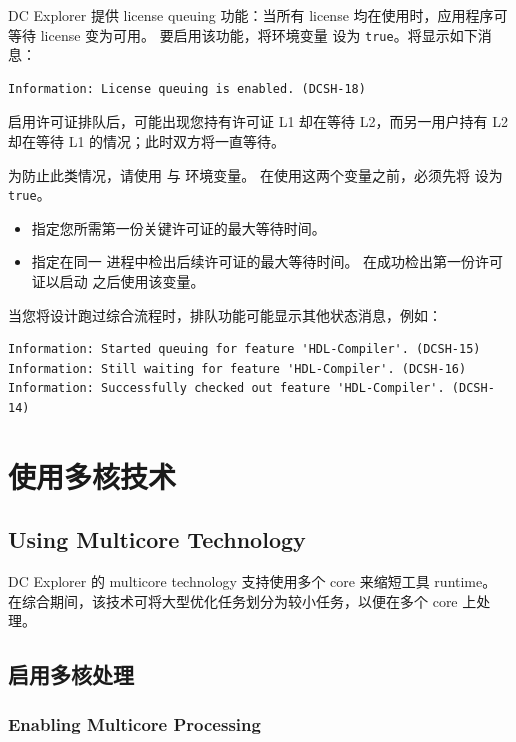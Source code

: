 DC Explorer 提供 license queuing 功能：当所有 license 均在使用时，应用程序可等待 license 变为可用。
要启用该功能，将环境变量  设为 \texttt{true}。将显示如下消息：
\begin{lstlisting}
Information: License queuing is enabled. (DCSH-18)
\end{lstlisting}

启用许可证排队后，可能出现您持有许可证 L1 却在等待 L2，而另一用户持有 L2 却在等待 L1 的情况；此时双方将一直等待。

为防止此类情况，请使用  与  环境变量。
在使用这两个变量之前，必须先将  设为 \texttt{true}。
\begin{itemize}
  \item {} 指定您所需第一份关键许可证的最大等待时间。
  \item {} 指定在同一  进程中检出后续许可证的最大等待时间。
        在成功检出第一份许可证以启动  之后使用该变量。
\end{itemize}

当您将设计跑过综合流程时，排队功能可能显示其他状态消息，例如：
\begin{lstlisting}
Information: Started queuing for feature 'HDL-Compiler'. (DCSH-15)
Information: Still waiting for feature 'HDL-Compiler'. (DCSH-16)
Information: Successfully checked out feature 'HDL-Compiler'. (DCSH-14)
\end{lstlisting}

\section{使用多核技术}
\subsection*{Using Multicore Technology}

DC Explorer 的 multicore technology 支持使用多个 core 来缩短工具 runtime。
在综合期间，该技术可将大型优化任务划分为较小任务，以便在多个 core 上处理。

\subsection{启用多核处理}
\subsubsection*{Enabling Multicore Processing}

